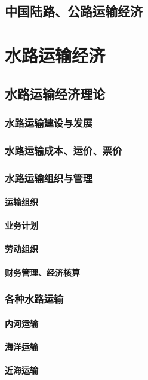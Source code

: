 \documentclass[UTF8]{../../RepresentationUniverse}
\begin{document}
\section{中国陆路、公路运输经济}




\chapter{水路运输经济}
\section{水路运输经济理论}
    \subsection{水路运输建设与发展}
    \subsection{水路运输成本、运价、票价}
    \subsection{水路运输组织与管理}
        \subsubsection{运输组织}
        \subsubsection{业务计划}
        \subsubsection{劳动组织}
        \subsubsection{财务管理、经济核算}
    \subsection{各种水路运输}
        \subsubsection{内河运输}
        \subsubsection{海洋运输}
        \subsubsection{近海运输}
\end{document}
